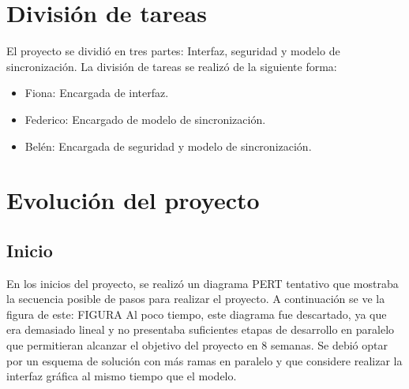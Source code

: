 \documentclass{article}
\begin{document}
\section{División de tareas}

	El proyecto se dividió en tres partes: Interfaz, seguridad y modelo de sincronización. La división de tareas se realizó de la siguiente forma:
\smallskip


\begin{itemize}
\item Fiona: Encargada de interfaz.
\item Federico: Encargado de modelo de sincronización.
\item Belén: Encargada de seguridad y modelo de sincronización.
\end{itemize}
\bigskip\smallskip




\section{Evolución del proyecto}
\smallskip
	
\subsection{Inicio}
\smallskip

	En los inicios del proyecto, se realizó un diagrama PERT tentativo que mostraba la secuencia posible de pasos para realizar el proyecto. A continuación se ve la figura de este:
FIGURA
	Al poco tiempo, este diagrama fue descartado, ya que era demasiado lineal y no presentaba suficientes etapas de desarrollo en paralelo que permitieran alcanzar el objetivo del proyecto en 8 semanas. Se debió optar por un esquema de solución con más ramas en paralelo y que considere realizar la interfaz gráfica al mismo tiempo que el modelo.
\bigskip
\end{document}
